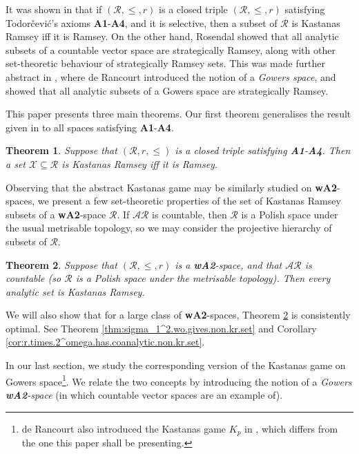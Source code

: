 \documentclass[11pt,reqno]{amsart}
\theoremstyle{plain}
\numberwithin{equation}{section}
\newtheorem{theorem}{Theorem}[section]
\theoremstyle{definition}
\newcommand{\cal}{\mathcal}
\newcommand{\X}{\cal{X}}
\begin{document}
It was shown in \cite{CD23} that if $(\cal{R},\leq,r)$ is a closed triple $(\cal{R},\leq,r)$ satisfying Todor\v{c}evi\'{c}'s axioms \textbf{A1}-\textbf{A4}, and it is selective, then a subset of $\cal{R}$ is Kastanas Ramsey iff it is Ramsey. On the other hand, Rosendal showed that all analytic subsets of a countable vector space are strategically Ramsey, along with other set-theoretic behaviour of strategically Ramsey sets. This was made further abstract in \cite{d20}, where de Rancourt introduced the notion of a \emph{Gowers space}, and showed that all analytic subsets of a Gowers space are strategically Ramsey.

This paper presents three main theorems. Our first theorem generalises the result given in \cite{CD23} to all spaces satisfying \textbf{A1}-\textbf{A4}.

\begin{theorem}
\label{thm:kr.iff.r}
    Suppose that $(\cal{R},r,\leq)$ is a closed triple satisfying \textbf{A1}-\textbf{A4}. Then a set $\X \subseteq \cal{R}$ is Kastanas Ramsey iff it is Ramsey.
\end{theorem}

Observing that the abstract Kastanas game may be similarly studied on \textbf{wA2}-spaces, we present a few set-theoretic properties of the set of Kastanas Ramsey subsets of a \textbf{wA2}-space $\cal{R}$. If $\cal{AR}$ is countable, then $\cal{R}$ is a Polish space under the usual metrisable topology, so we may consider the projective hierarchy of subsets of $\cal{R}$. 

\begin{theorem}
\label{thm:analytic.is.kr}
    Suppose that $(\cal{R},\leq,r)$ is a \textbf{wA2}-space, and that $\cal{AR}$ is countable (so $\cal{R}$ is a Polish space under the metrisable topology). Then every analytic set is Kastanas Ramsey. 
\end{theorem}

We will also show that for a large class of \textbf{wA2}-spaces, Theorem \ref{thm:analytic.is.kr} is consistently optimal. See Theorem \ref{thm:sigma_1^2.wo.gives.non.kr.set} and Corollary \ref{cor:r.times.2^omega.has.coanalytic.non.kr.set}.

In our last section, we study the corresponding version of the Kastanas game on Gowers space\footnote{de Rancourt also introduced the Kastanas game $K_p$ in \cite{d20}, which differs from the one this paper shall be presenting.}. We relate the two concepts by introducing the notion of a \emph{Gowers \textbf{wA2}-space} (in which countable vector spaces are an example of).
\end{document}

